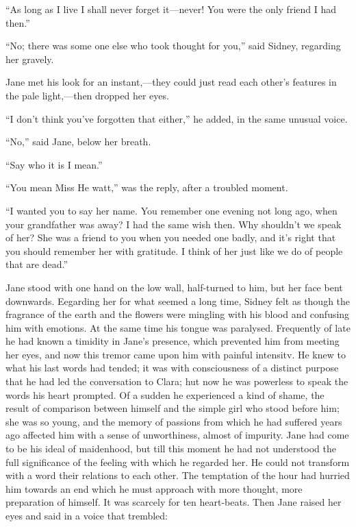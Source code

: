 ``As long as I live I shall never forget it---never! You were the only
friend I had then.''

``No; there was some one else who took thought for you,'' said Sidney,
regarding her gravely.

Jane met his look for an instant,---they could just read each other's
features in the pale light,---then dropped her eyes.

``I don't think you've forgotten that either,'' he added, in the same
unusual voice.

{\protect\hypertarget{118}{}{}}``No,'' said Jane, below her breath.

``Say who it is I mean.''

``You mean Miss He watt,'' was the reply, after a troubled moment.

``I wanted you to say her name. You remember one evening not long ago,
when your grandfather was away? I had the same wish then. Why shouldn't
we speak of her? She was a friend to you when you needed one badly, and
it's right that you should remember her with gratitude. I think of her
just like we do of people that are dead.''

Jane stood with one hand on the low wall, half-turned to him, but her
face bent downwards. Eegarding her for what seemed a long time, Sidney
felt as though the fragrance of the earth and the flowers were mingling
with his blood and confusing him with emotions. At the same time his
tongue was paralysed. Frequently of late he had known a timidity in
Jane's presence, which prevented him from meeting her eyes, and now this
tremor came upon him with painful intensitv. He knew to what his last
{\protect\hypertarget{119}{}{}}words had tended; it was with
consciousness of a distinct purpose that he had led the conversation to
Clara; hut now he was powerless to speak the words his heart prompted.
Of a sudden he experienced a kind of shame, the result of comparison
between himself and the simple girl who stood before him; she was so
young, and the memory of passions from which he had suffered years ago
affected him with a sense of unworthiness, almost of impurity. Jane had
come to be his ideal of maidenhood, but till this moment he had not
understood the full significance of the feeling with which he regarded
her. He could not transform with a word their relations to each other.
The temptation of the hour had hurried him towards an end which he must
approach with more thought, more preparation of himself. It was scarcely
for ten heart-beats. Then Jane raised her eyes and said in a voice that
trembled:

